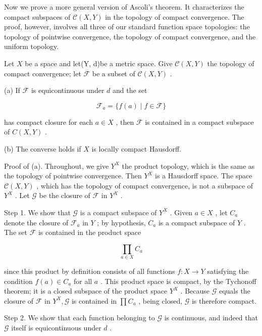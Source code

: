 Now we prove a more general version of Ascoli's theorem. It characterizes the compact subspaces of \(\mathcal{C}\left( {X,Y}\right)\) in the topology of compact convergence. The proof, however, involves all three of our standard function space topologies: the topology of pointwise convergence, the topology of compact convergence, and the uniform topology.

\begin{theorem} Let \(X\) be a space and let(Y, d)be a metric space. Give \(\mathcal{C}\left( {X,Y}\right)\) the topology of compact convergence; let \(\mathcal{F}\) be a subset of \(\mathcal{C}\left( {X,Y}\right)\) .

(a) If \(\mathcal{F}\) is equicontinuous under \(d\) and the set

\[
{\mathcal{F}}_{a} = \{ f\left( a\right)  \mid  f \in  \mathcal{F}\}
\]

has compact closure for each \(a \in  X\) , then \(\mathcal{F}\) is contained in a compact subspace of \(C\left( {X,Y}\right)\) .

(b) The converse holds if \(X\) is locally compact Hausdorff.
\end{theorem}

Proof of (a). Throughout, we give \({Y}^{X}\) the product topology, which is the same as the topology of pointwise convergence. Then \({Y}^{X}\) is a Hausdorff space. The space \(\mathcal{C}\left( {X,Y}\right)\) , which has the topology of compact convergence, is not a subspace of \({Y}^{X}\) . Let \(\mathcal{G}\) be the closure of \(\mathcal{F}\) in \({Y}^{X}\) .

Step 1. We show that \(\mathcal{G}\) is a compact subspace of \({Y}^{X}\) . Given \(a \in  X\) , let \({C}_{a}\) denote the closure of \({\mathcal{F}}_{a}\) in \(Y\) ; by hypothesis, \({C}_{a}\) is a compact subspace of \(Y\) . The set \(\mathcal{F}\) is contained in the product space

\[
\mathop{\prod }\limits_{{a \in  X}}{C}_{a}
\]

since this product by definition consists of all functions \(f : X \rightarrow  Y\) satisfying the condition \(f\left( a\right)  \in  {C}_{a}\) for all \(a\) . This product space is compact, by the Tychonoff theorem; it is a closed subspace of the product space \({Y}^{X}\) . Because \(\mathcal{G}\) equals the closure of \(\mathcal{F}\) in \({Y}^{X},\mathcal{G}\) is contained in \(\prod {C}_{a}\) , being closed, \(\mathcal{G}\) is therefore compact.

Step 2. We show that each function belonging to \(\mathcal{G}\) is continuous, and indeed that \(\mathcal{G}\) itself is equicontinuous under \(d\) .

